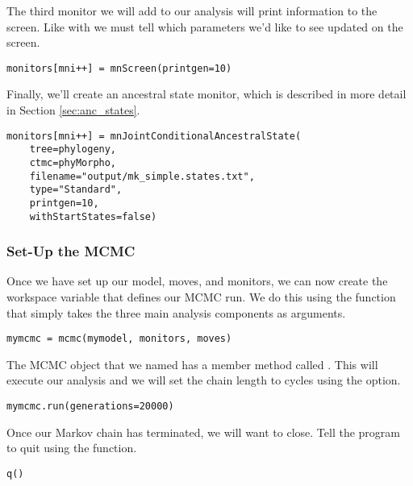 The third monitor we will add to our analysis will print information to the screen.
Like with  we must tell  which parameters we'd like to see updated on the screen. 
{\tt \begin{snugshade*}
\begin{lstlisting}
monitors[mni++] = mnScreen(printgen=10)
\end{lstlisting}
\end{snugshade*}}

Finally, we'll create an ancestral state monitor, which is described in more detail in Section \ref{sec:anc_states}.
{\tt \begin{snugshade*}
\begin{lstlisting}
monitors[mni++] = mnJointConditionalAncestralState(
    tree=phylogeny,
    ctmc=phyMorpho,
    filename="output/mk_simple.states.txt",
    type="Standard",
    printgen=10,
    withStartStates=false)
\end{lstlisting}
\end{snugshade*}}


\medskip
\subsubsection{Set-Up the MCMC}

Once we have set up our model, moves, and monitors, we can now create the workspace variable that defines our MCMC run. 
We do this using the  function that simply takes the three main analysis components as arguments.
{\tt \begin{snugshade*}
\begin{lstlisting}
mymcmc = mcmc(mymodel, monitors, moves)\end{lstlisting}
\end{snugshade*}}

The MCMC object that we named  has a member method called . 
This will execute our analysis and we will set the chain length to  cycles using the  option.
{\tt \begin{snugshade*}
\begin{lstlisting}
mymcmc.run(generations=20000)
\end{lstlisting}
\end{snugshade*}}

Once our Markov chain has terminated, we will want \RevBayes to close. 
Tell the program to quit using the  function.
{\tt \begin{snugshade*}
\begin{lstlisting}
q()
\end{lstlisting}
\end{snugshade*}}

